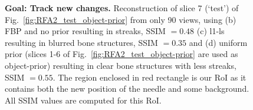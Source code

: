 \documentclass[journal]{IEEEtran}
\begin{document}
\begin{figure}[!h]
\centering
{}\hfill
{}\hfill
{}\hfill
{}
\caption[Representative results-1]{\textbf{Goal: Track new changes.}\small{ Reconstruction of slice 7 (`test') of Fig.~\ref{fig:RFA2_test_object-prior} from only 90 views, using (b) FBP and no prior resulting in streaks, SSIM $= 0.48$ (c) l1-ls resulting in blurred bone structures, SSIM $=0.35$ and (d) uniform prior (slices 1-6 of Fig.~\ref{fig:RFA2_test_object-prior} are used as object-prior) resulting in clear bone structures with less streaks, SSIM $=0.55$. The region enclosed in red rectangle is our RoI as it contains both the new position of the needle and some background. All SSIM values are computed for this RoI.}}
\label{fig:RFA2_very_few_views}
\end{figure}
\end{document}
